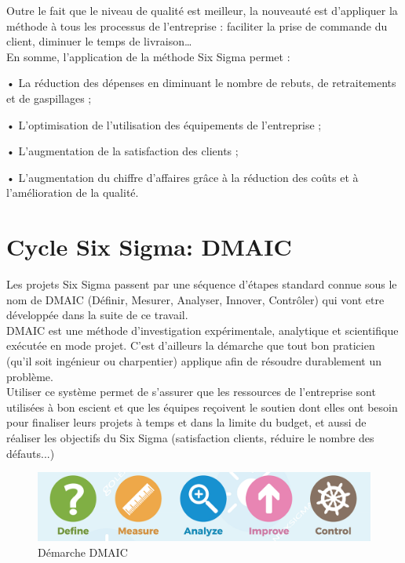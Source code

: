 \documentclass[12pt, a4paper]{thesis}
\begin{document}
Outre le fait que le niveau de qualité est meilleur, la nouveauté est d’appliquer la méthode à tous les processus de l’entreprise : faciliter la prise de commande du client, diminuer le temps de livraison…\\
En somme, l’application de la méthode Six Sigma permet :
\item• La réduction des dépenses en diminuant le nombre de rebuts, de retraitements et de gaspillages ;
\item• L’optimisation de l’utilisation des équipements de l’entreprise ;
\item• L’augmentation de la satisfaction des clients ;
\item• L’augmentation du chiffre d’affaires grâce à la réduction des coûts et à l’amélioration de la qualité.

\section{Cycle Six Sigma: DMAIC}
Les projets Six Sigma passent par une séquence d’étapes standard connue sous le nom de DMAIC (Définir, Mesurer, Analyser, Innover, Contrôler) qui vont etre développée dans la suite de ce travail.\\

DMAIC est une méthode d’investigation expérimentale, analytique et scientifique exécutée en mode projet. C’est d’ailleurs la démarche que tout bon praticien (qu’il soit ingénieur ou charpentier) applique afin de résoudre durablement un problème. \\
Utiliser ce système permet de s’assurer que les ressources de l’entreprise sont utilisées à bon escient et que les équipes reçoivent le soutien dont elles ont besoin pour finaliser leurs projets à temps et dans la limite du budget, et aussi de réaliser les objectifs du Six Sigma (satisfaction clients, réduire le nombre des défauts...)

\begin{figure}[!h]
\begin{center}
        \includegraphics[scale=0.4]{DMAIC1.png}
        \caption{Démarche DMAIC}
\end{center}
\end{figure}
\end{document}
